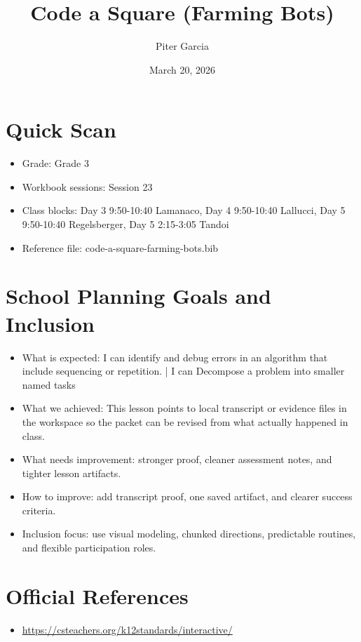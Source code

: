 \documentclass[11pt]{article}
\title{Code a Square (Farming Bots)}
\author{Piter Garcia}
\date{March 20, 2026}
\begin{document}
\maketitle
\section*{Quick Scan}
\begin{itemize}[leftmargin=*]
\item Grade: Grade 3
\item Workbook sessions: Session 23
\item Class blocks: Day 3 9:50-10:40 Lamanaco, Day 4 9:50-10:40 Lallucci, Day 5 9:50-10:40 Regelsberger, Day 5 2:15-3:05 Tandoi
\item Reference file: code-a-square-farming-bots.bib
\end{itemize}
\section*{School Planning Goals and Inclusion}
\begin{itemize}[leftmargin=*]
\item What is expected: I can identify and debug errors in an algorithm that include sequencing or repetition. | I can Decompose a problem into smaller named tasks
\item What we achieved: This lesson points to local transcript or evidence files in the workspace so the packet can be revised from what actually happened in class.
\item What needs improvement: stronger proof, cleaner assessment notes, and tighter lesson artifacts.
\item How to improve: add transcript proof, one saved artifact, and clearer success criteria.
\item Inclusion focus: use visual modeling, chunked directions, predictable routines, and flexible participation roles.
\end{itemize}
\section*{Official References}
\begin{itemize}[leftmargin=*]
\item \url{https://csteachers.org/k12standards/interactive/}

\end{itemize}
\end{document}
